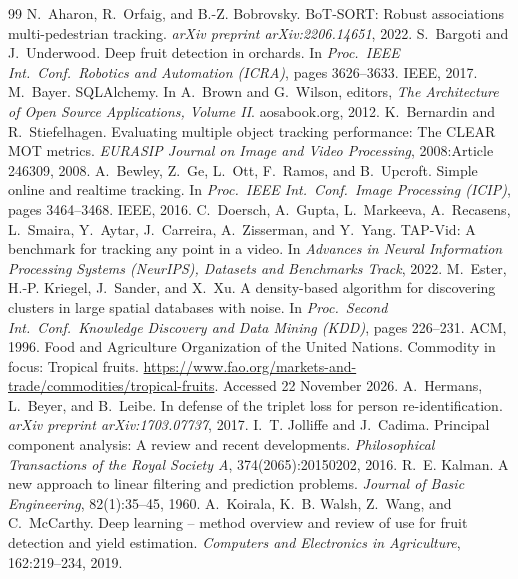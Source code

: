 \documentclass[11pt,a4paper]{article}
\begin{document}
\clearpage
\begin{thebibliography}{99}
 N.~Aharon, R.~Orfaig, and B.-Z. Bobrovsky. BoT-SORT: Robust associations multi-pedestrian tracking. \emph{arXiv preprint arXiv:2206.14651}, 2022.
 S.~Bargoti and J.~Underwood. Deep fruit detection in orchards. In \emph{Proc.\ IEEE Int.\ Conf.\ Robotics and Automation (ICRA)}, pages 3626--3633. IEEE, 2017.
 M.~Bayer. SQLAlchemy. In A.~Brown and G.~Wilson, editors, \emph{The Architecture of Open Source Applications, Volume II}. aosabook.org, 2012.
 K.~Bernardin and R.~Stiefelhagen. Evaluating multiple object tracking performance: The CLEAR MOT metrics. \emph{EURASIP Journal on Image and Video Processing}, 2008:Article 246309, 2008.
 A.~Bewley, Z.~Ge, L.~Ott, F.~Ramos, and B.~Upcroft. Simple online and realtime tracking. In \emph{Proc.\ IEEE Int.\ Conf.\ Image Processing (ICIP)}, pages 3464--3468. IEEE, 2016.
 C.~Doersch, A.~Gupta, L.~Markeeva, A.~Recasens, L.~Smaira, Y.~Aytar, J.~Carreira, A.~Zisserman, and Y.~Yang. TAP-Vid: A benchmark for tracking any point in a video. In \emph{Advances in Neural Information Processing Systems (NeurIPS), Datasets and Benchmarks Track}, 2022.
 M.~Ester, H.-P. Kriegel, J.~Sander, and X.~Xu. A density-based algorithm for discovering clusters in large spatial databases with noise. In \emph{Proc.\ Second Int.\ Conf.\ Knowledge Discovery and Data Mining (KDD)}, pages 226--231. ACM, 1996.
 Food and Agriculture Organization of the United Nations. Commodity in focus: Tropical fruits. \url{https://www.fao.org/markets-and-trade/commodities/tropical-fruits}. Accessed 22 November 2026.
 A.~Hermans, L.~Beyer, and B.~Leibe. In defense of the triplet loss for person re-identification. \emph{arXiv preprint arXiv:1703.07737}, 2017.
 I.~T. Jolliffe and J.~Cadima. Principal component analysis: A review and recent developments. \emph{Philosophical Transactions of the Royal Society A}, 374(2065):20150202, 2016.
 R.~E. Kalman. A new approach to linear filtering and prediction problems. \emph{Journal of Basic Engineering}, 82(1):35--45, 1960.
 A.~Koirala, K.~B. Walsh, Z.~Wang, and C.~McCarthy. Deep learning -- method overview and review of use for fruit detection and yield estimation. \emph{Computers and Electronics in Agriculture}, 162:219--234, 2019.

\end{thebibliography}
\end{document}
